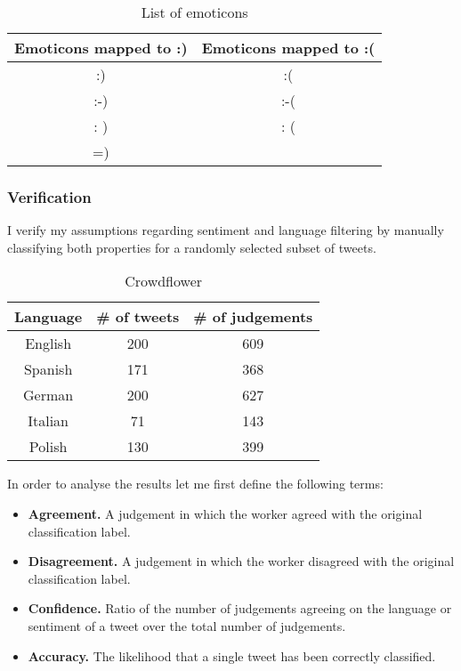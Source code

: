 \begin{table}
  \begin{center}
    \begin{tabular}{ | c | c | }
      \hline
        Emoticons mapped to :) & Emoticons mapped to :( \\
      \hline
        :)  & :( \\
        :-) & :-( \\
        : ) & : ( \\
        =)  & \\
      \hline
    \end{tabular}
    \caption{\label{tab:emoticons}List of emoticons}
  \end{center}
\end{table}

\subsubsection{Verification}

I verify my assumptions regarding sentiment and language filtering by manually classifying both properties for a randomly selected subset of tweets.

\begin{table}[H]
  \begin{center}
    \begin{tabular}{ | c | c | c | }
      \hline
        Language & \# of tweets & \# of judgements \\
      \hline
        English & 200 & 609 \\
        Spanish & 171 & 368 \\
        German & 200 & 627 \\
        Italian & 71 & 143 \\
        Polish & 130 & 399 \\
      \hline
    \end{tabular}
    \caption{\label{tab:crowdflower1}Crowdflower}
  \end{center}
\end{table}

In order to analyse the results let me first define the following terms:

\begin{itemize}
  \item \textbf{Agreement.} A judgement in which the worker agreed with the original classification label.
  \item \textbf{Disagreement.} A judgement in which the worker disagreed with the original classification label.
  \item \textbf{Confidence.} Ratio of the number of judgements agreeing on the language or sentiment of a tweet over the total number of judgements.
  \item \textbf{Accuracy.} The likelihood that a single tweet has been correctly classified.
\end{itemize}

